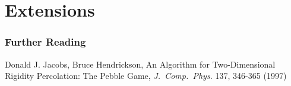 \documentclass[]{beamer}
\begin{document}
\section{Extensions}





\begin{frame}
  \frametitle{Further Reading}
  \begin{thebibliography}{10}
  \beamertemplatebookbibitems
  Donald J. Jacobs, Bruce Hendrickson, An Algorithm for Two-Dimensional Rigidity Percolation: The Pebble Game, \textit{J.~Comp.~Phys.} 137, 346-365 (1997)
  \end{thebibliography}
\end{frame}
\end{document}
